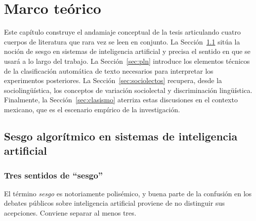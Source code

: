 \chapter{Marco teórico}
\label{cap:marco}

Este capítulo construye el andamiaje conceptual de la tesis articulando cuatro
cuerpos de literatura que rara vez se leen en conjunto. La
Sección~\ref{sec:sesgo-algoritmico} sitúa la noción de sesgo en sistemas de
inteligencia artificial y precisa el sentido en que se usará a lo largo del
trabajo. La Sección~\ref{sec:pln} introduce los elementos técnicos de la
clasificación automática de texto necesarios para interpretar los experimentos
posteriores. La Sección~\ref{sec:sociolectos} recupera, desde la
sociolingüística, los conceptos de variación sociolectal y discriminación
lingüística. Finalmente, la Sección~\ref{sec:clasismo} aterriza estas
discusiones en el contexto mexicano, que es el escenario empírico de la
investigación.

\section{Sesgo algorítmico en sistemas de inteligencia artificial}
\label{sec:sesgo-algoritmico}

\subsection{Tres sentidos de ``sesgo''}
\label{sec:tres-sentidos}

El término \emph{sesgo} es notoriamente polisémico, y buena parte de la
confusión en los debates públicos sobre inteligencia artificial proviene de no
distinguir sus acepciones. Conviene separar al menos tres.


